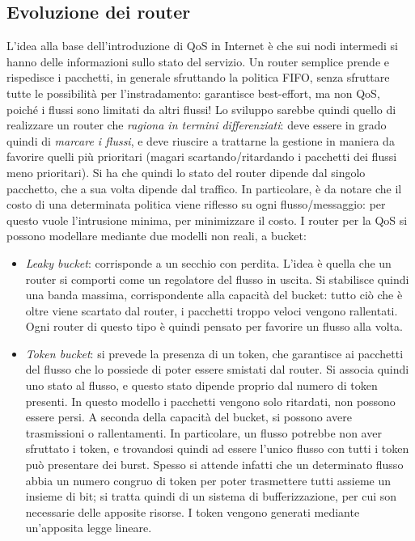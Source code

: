 \subsection{Evoluzione dei router}
L'idea alla base dell'introduzione di QoS in Internet è che sui nodi intermedi si hanno delle informazioni sullo stato
del servizio. Un router semplice prende e rispedisce i pacchetti, in generale sfruttando la politica FIFO, senza
sfruttare tutte le possibilità per l'instradamento: garantisce best-effort, ma non QoS, poiché i flussi sono limitati 
da altri flussi!
Lo sviluppo sarebbe quindi quello di realizzare un router che \textit{ragiona in termini differenziati}: deve essere 
in grado quindi di \textit{marcare i flussi}, e deve riuscire a trattarne la gestione in maniera da favorire
quelli più prioritari (magari scartando/ritardando i pacchetti dei flussi meno prioritari). Si ha che quindi
lo stato del router dipende dal singolo pacchetto, che a sua volta dipende dal traffico. In particolare, è da notare 
che il costo di una determinata politica viene riflesso su ogni flusso/messaggio: per questo vuole l'intrusione minima,
per minimizzare il costo.
I router per la QoS si possono modellare mediante due modelli non reali, a bucket:
\begin{itemize}
 \item \textit{Leaky bucket}: corrisponde a un secchio con perdita. L'idea è quella che un router si comporti come un
 regolatore del flusso in uscita. Si stabilisce quindi una banda massima, corrispondente alla capacità del bucket: 
 tutto ciò che è oltre viene scartato dal router, i pacchetti troppo veloci vengono rallentati. Ogni router di questo
 tipo è quindi pensato per favorire un flusso alla volta.
 \item \textit{Token bucket}: si prevede la presenza di un token, che garantisce ai pacchetti del flusso che lo
 possiede di poter essere smistati dal router. Si associa quindi uno stato al flusso, e questo stato dipende proprio 
 dal numero di token presenti. In questo modello i pacchetti vengono solo ritardati, non possono essere persi. 
 A seconda della capacità del bucket, si possono avere trasmissioni o rallentamenti. In particolare, un flusso potrebbe
 non aver sfruttato i token, e trovandosi quindi ad essere l'unico flusso con tutti i token può presentare dei burst.
 Spesso si attende infatti che un determinato flusso abbia un numero congruo di token per poter trasmettere tutti
 assieme un insieme di bit; si tratta quindi di un sistema di bufferizzazione, per cui son necessarie delle apposite
 risorse. I token vengono generati mediante un'apposita legge lineare.
\end{itemize}
